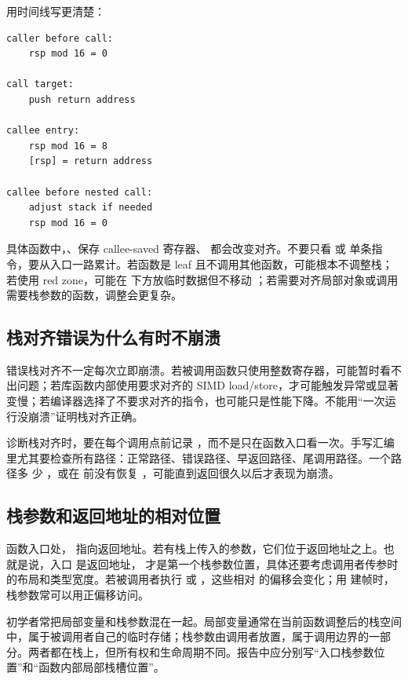 用时间线写更清楚：

\begin{lstlisting}
caller before call:
    rsp mod 16 = 0

call target:
    push return address

callee entry:
    rsp mod 16 = 8
    [rsp] = return address

callee before nested call:
    adjust stack if needed
    rsp mod 16 = 0
\end{lstlisting}

具体函数中，、保存 callee-saved 寄存器、 都会改变对齐。不要只看  或  单条指令，要从入口一路累计。若函数是 leaf 且不调用其他函数，可能根本不调整栈；若使用 red zone，可能在  下方放临时数据但不移动 ；若需要对齐局部对象或调用需要栈参数的函数，调整会更复杂。

\subsection{栈对齐错误为什么有时不崩溃}

错误栈对齐不一定每次立即崩溃。若被调用函数只使用整数寄存器，可能暂时看不出问题；若库函数内部使用要求对齐的 SIMD load/store，才可能触发异常或显著变慢；若编译器选择了不要求对齐的指令，也可能只是性能下降。不能用“一次运行没崩溃”证明栈对齐正确。

诊断栈对齐时，要在每个调用点前记录 ，而不是只在函数入口看一次。手写汇编里尤其要检查所有路径：正常路径、错误路径、早返回路径、尾调用路径。一个路径多  少 ，或在  前没有恢复 ，可能直到返回很久以后才表现为崩溃。

\subsection{栈参数和返回地址的相对位置}

函数入口处， 指向返回地址。若有栈上传入的参数，它们位于返回地址之上。也就是说，入口 \code{[rsp]} 是返回地址，\code{[rsp + 8]} 才是第一个栈参数位置，具体还要考虑调用者传参时的布局和类型宽度。若被调用者执行  或 ，这些相对  的偏移会变化；用  建帧时，栈参数常可以用正偏移访问。

初学者常把局部变量和栈参数混在一起。局部变量通常在当前函数调整后的栈空间中，属于被调用者自己的临时存储；栈参数由调用者放置，属于调用边界的一部分。两者都在栈上，但所有权和生命周期不同。报告中应分别写“入口栈参数位置”和“函数内部局部栈槽位置”。

